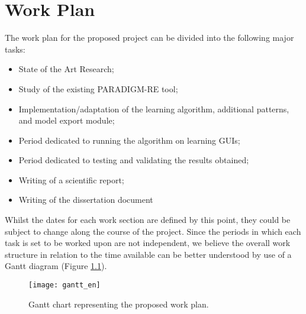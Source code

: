 \chapter{Work Plan} \label{chap:workplan}





The work plan for the proposed project can be divided into the following major tasks:
\begin{itemize}
\item State of the Art Research;
\item Study of the existing PARADIGM-RE tool;
\item Implementation/adaptation of the learning algorithm, additional patterns, and model export module;
\item Period dedicated to running the algorithm on learning GUIs;
\item Period dedicated to testing and validating the results obtained;
\item Writing of a scientific report;
\item Writing of the dissertation document
\end{itemize}

Whilst the dates for each work section are defined by this point, they could be subject to change along the course of the project. Since the periods in which each task is set to be worked upon are not independent, we believe the overall work structure in relation to the time available can be better understood by use of a Gantt diagram (Figure \ref{fig:gantt}).

\begin{figure}[!ht]
  \begin{center}
    \texttt{[image: gantt\_en]}
  \end{center}
   \caption{Gantt chart representing the proposed work plan.}
  \label{fig:gantt}
\end{figure}

